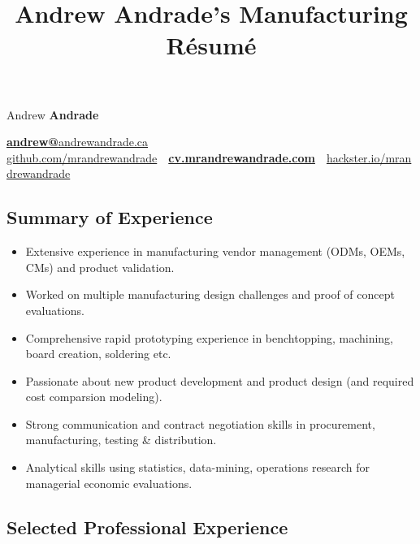 \documentclass[pdftex,11pt,letterpaper]{article}
\title{Andrew Andrade's Manufacturing Résumé}
\begin{document}
\font

\begin{center}
  {\Huge Andrew \textbf{Andrade}}

  {\large
    \href{mailto:andrew@andrewandrade.ca}{\textbf{andrew@}}\href{http://andrewandrade.ca}{andrewandrade.ca} \\ 

    \href{https://github.com/mrandrewandrade}{github.com/mrandrewandrade}\ \textperiodcentered \ \href{http://cv.mrandrewandrade.com}{\textbf{cv.mrandrewandrade.com}}\ \textperiodcentered \ \href{https://www.hackster.io/mrandrewandrade}{hackster.io/mrandrewandrade}
  }
\end{center}

\subsection*{Summary of Experience}

\begin{itemize}[before=,after=]

\item Extensive experience in manufacturing vendor management (ODMs, OEMs, CMs) and product validation.
  
\item Worked on multiple manufacturing design challenges and proof of concept evaluations.

\item Comprehensive rapid prototyping experience in benchtopping, machining, board creation, soldering etc.

\item Passionate about new product development and product design (and required cost comparsion modeling).

\item Strong communication and contract negotiation skills in procurement, manufacturing, testing \& distribution.

\item Analytical skills using statistics, data-mining, operations research for managerial economic evaluations.

\end{itemize}

\subsection*{Selected Professional Experience}
\end{document}
